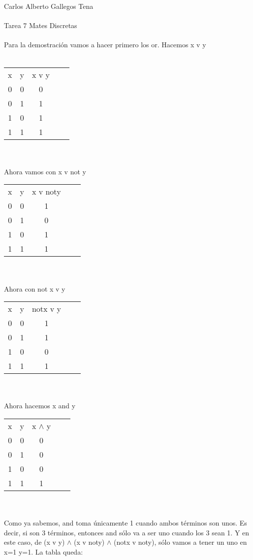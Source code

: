 \documentclass[a4paper,10pt]{article}
\title{}
\author{}
\date{}
\begin{document}
\maketitle
Carlos Alberto Gallegos Tena \\\\
Tarea 7 Mates Discretas\\\\
Para la demostración vamos a hacer primero los or. Hacemos x v y\\\\
\begin{tabular}{ c c c c c}
 x & y & x v y \\ 
 0 & 0 & 0 \\  
 0 & 1 & 1 \\
 1 & 0 & 1 \\
 1 & 1 & 1  
\end{tabular}\\\\
Ahora vamos con x v not y\\
\begin{tabular}{ c c c c c}
 x & y & x v noty \\ 
 0 & 0 & 1 \\  
 0 & 1 & 0 \\
 1 & 0 & 1 \\
 1 & 1 & 1  
\end{tabular}\\\\
Ahora con not x v y\\
\begin{tabular}{ c c c c c}
 x & y & notx v y \\ 
 0 & 0 & 1 \\  
 0 & 1 & 1 \\
 1 & 0 & 0 \\
 1 & 1 & 1  
\end{tabular}\\\\
Ahora hacemos x and y\\
\begin{tabular}{ c c c c c}
x & y & x $\wedge$  y \\ 
 0 & 0 & 0 \\  
 0 & 1 & 0 \\
 1 & 0 & 0 \\
 1 & 1 & 1  
\end{tabular}\\\\
Como ya sabemos, and toma únicamente 1 cuando ambos términos son unos. Es decir, si son 3 términos, entonces and sólo va a ser uno cuando los 3 sean 1. Y en este caso, de (x v y) $\wedge$ (x v noty) $\wedge$ (notx v noty), sólo vamos a tener un uno en x=1 y=1. La tabla queda:\\\\
\end{document}
